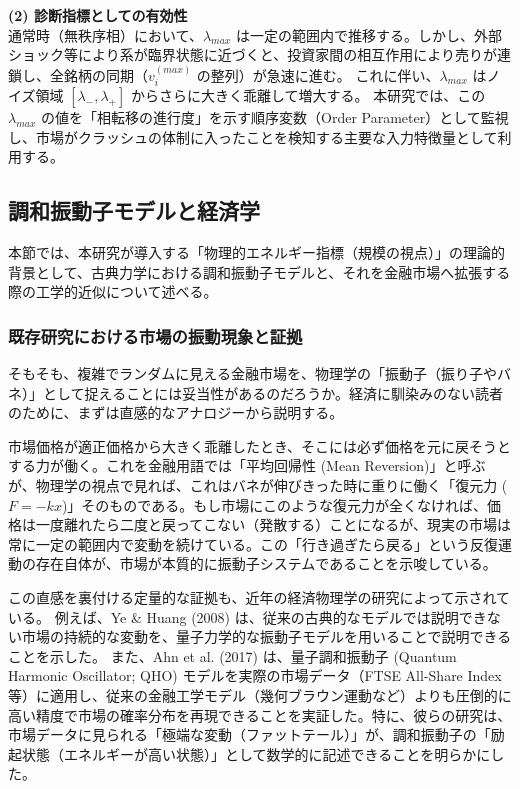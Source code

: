 \documentclass[11pt,a4paper,oneside]{ltjsarticle}
\begin{document}
\textbf{(2) 診断指標としての有効性} \\
通常時（無秩序相）において、$\lambda_{max}$ は一定の範囲内で推移する。しかし、外部ショック等により系が臨界状態に近づくと、投資家間の相互作用により売りが連鎖し、全銘柄の同期（$v_{i}^{(max)}$ の整列）が急速に進む。
これに伴い、$\lambda_{max}$ はノイズ領域 $[\lambda_{-}, \lambda_{+}]$ からさらに大きく乖離して増大する。
本研究では、この $\lambda_{max}$ の値を「相転移の進行度」を示す順序変数（Order Parameter）として監視し、市場がクラッシュの体制に入ったことを検知する主要な入力特徴量として利用する。

\subsection{調和振動子モデルと経済学}
本節では、本研究が導入する「物理的エネルギー指標（規模の視点）」の理論的背景として、古典力学における調和振動子モデルと、それを金融市場へ拡張する際の工学的近似について述べる。

\subsubsection{既存研究における市場の振動現象と証拠}
そもそも、複雑でランダムに見える金融市場を、物理学の「振動子（振り子やバネ）」として捉えることには妥当性があるのだろうか。経済に馴染みのない読者のために、まずは直感的なアナロジーから説明する。

市場価格が適正価格から大きく乖離したとき、そこには必ず価格を元に戻そうとする力が働く。これを金融用語では「平均回帰性 (Mean Reversion)」と呼ぶが、物理学の視点で見れば、これはバネが伸びきった時に重りに働く「復元力 ($F=-kx$)」そのものである。もし市場にこのような復元力が全くなければ、価格は一度離れたら二度と戻ってこない（発散する）ことになるが、現実の市場は常に一定の範囲内で変動を続けている。この「行き過ぎたら戻る」という反復運動の存在自体が、市場が本質的に振動子システムであることを示唆している。

この直感を裏付ける定量的な証拠も、近年の経済物理学の研究によって示されている。
例えば、Ye \& Huang (2008) \cite{ye2008non} は、従来の古典的なモデルでは説明できない市場の持続的な変動を、量子力学的な振動子モデルを用いることで説明できることを示した。
また、Ahn et al. (2017) \cite{ahn2017modeling} は、量子調和振動子 (Quantum Harmonic Oscillator; QHO) モデルを実際の市場データ（FTSE All-Share Index等）に適用し、従来の金融工学モデル（幾何ブラウン運動など）よりも圧倒的に高い精度で市場の確率分布を再現できることを実証した。特に、彼らの研究は、市場データに見られる「極端な変動（ファットテール）」が、調和振動子の「励起状態（エネルギーが高い状態）」として数学的に記述できることを明らかにした。
\end{document}

